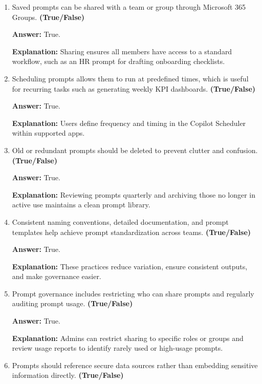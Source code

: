 \documentclass[10pt]{article}
\begin{document}
\begin{enumerate}[leftmargin=*]
\textbf{Answer:} True.

\textbf{Explanation:} For example, using names like “Finance – Monthly Summary Report” helps when scaling to dozens or hundreds of prompts.

\item Saved prompts can be shared with a team or group through Microsoft 365 Groups. \textbf{(True/False)}

\textbf{Answer:} True.

\textbf{Explanation:} Sharing ensures all members have access to a standard workflow, such as an HR prompt for drafting onboarding checklists.

\item Scheduling prompts allows them to run at predefined times, which is useful for recurring tasks such as generating weekly KPI dashboards. \textbf{(True/False)}

\textbf{Answer:} True.

\textbf{Explanation:} Users define frequency and timing in the Copilot Scheduler within supported apps.

\item Old or redundant prompts should be deleted to prevent clutter and confusion. \textbf{(True/False)}

\textbf{Answer:} True.

\textbf{Explanation:} Reviewing prompts quarterly and archiving those no longer in active use maintains a clean prompt library.

\item Consistent naming conventions, detailed documentation, and prompt templates help achieve prompt standardization across teams. \textbf{(True/False)}

\textbf{Answer:} True.

\textbf{Explanation:} These practices reduce variation, ensure consistent outputs, and make governance easier.

\item Prompt governance includes restricting who can share prompts and regularly auditing prompt usage. \textbf{(True/False)}

\textbf{Answer:} True.

\textbf{Explanation:} Admins can restrict sharing to specific roles or groups and review usage reports to identify rarely used or high-usage prompts.

\item Prompts should reference secure data sources rather than embedding sensitive information directly. \textbf{(True/False)}


\end{enumerate}
\end{document}

